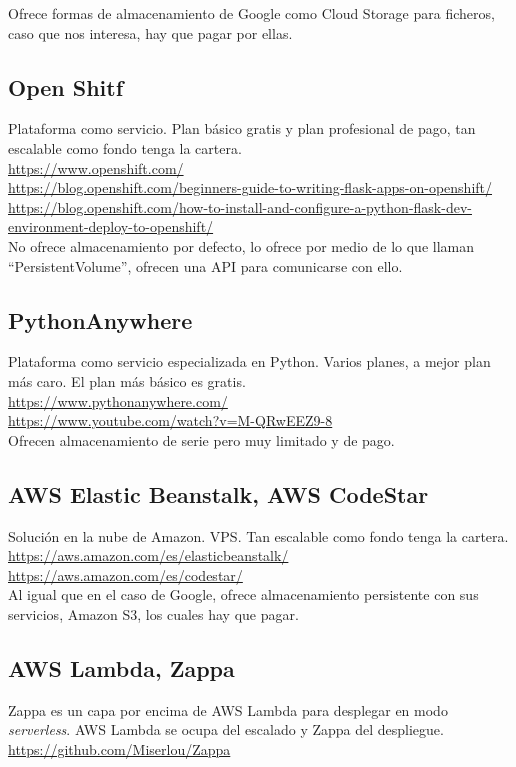 Ofrece formas de almacenamiento de Google como Cloud Storage para ficheros, caso que nos interesa, hay que pagar por ellas.
\subsection{Open Shitf}
Plataforma como servicio. Plan básico gratis y plan profesional de pago, tan escalable como fondo tenga la cartera.\\
\url{https://www.openshift.com/}\\
\url{https://blog.openshift.com/beginners-guide-to-writing-flask-apps-on-openshift/}\\
\url{https://blog.openshift.com/how-to-install-and-configure-a-python-flask-dev-environment-deploy-to-openshift/}\\

No ofrece almacenamiento por defecto, lo ofrece por medio de lo que llaman ``PersistentVolume'', ofrecen una API para comunicarse con ello.
\subsection{PythonAnywhere} 
Plataforma como servicio especializada en Python. Varios planes, a mejor plan más caro. El plan más básico es gratis.\\
\url{https://www.pythonanywhere.com/}\\
\url{https://www.youtube.com/watch?v=M-QRwEEZ9-8}\\
Ofrecen almacenamiento de serie pero muy limitado y de pago.
\subsection{AWS Elastic Beanstalk,  AWS CodeStar}
Solución en la nube de Amazon. VPS. Tan escalable como fondo tenga la cartera.\\
\url{https://aws.amazon.com/es/elasticbeanstalk/}\\
\url{https://aws.amazon.com/es/codestar/}\\

Al igual que en el caso de Google, ofrece almacenamiento persistente con sus servicios, Amazon S3, los cuales hay que pagar.
\subsection{AWS Lambda, Zappa}
Zappa es un capa por encima de AWS Lambda para desplegar en modo \textit{serverless}. AWS Lambda se ocupa del escalado y Zappa del despliegue.\\
\url{https://github.com/Miserlou/Zappa}\\

